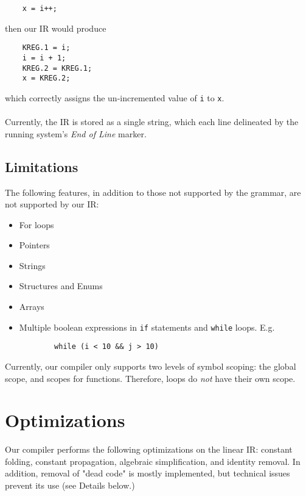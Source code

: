 \documentclass{scrartcl}
\begin{document}
\begin{verbatim}
    x = i++;
\end{verbatim}
then our IR would produce
\begin{verbatim}
    KREG.1 = i;
    i = i + 1;
    KREG.2 = KREG.1;
    x = KREG.2;
\end{verbatim}
which correctly assigns the un-incremented value of \verb|i| to \verb|x|.\\
\\
Currently, the IR is stored as a single string, which each line delineated by the running system's \textit{End of Line} marker.

\subsection{Limitations}
The following features, in addition to those not supported by the grammar, are not supported by our IR:
\begin{itemize}
    \item For loops
    \item Pointers
    \item Strings
    \item Structures and Enums
    \item Arrays
    \item Multiple boolean expressions in \verb|if| statements and \verb|while| loops. E.g.
    \begin{verbatim}
        while (i < 10 && j > 10)
    \end{verbatim}
\end{itemize}
Currently, our compiler only supports two levels of symbol scoping: the global scope, and scopes for functions. Therefore, loops do \textit{not} have their own scope.

\section{Optimizations}
Our compiler performs the following optimizations on the linear IR: constant folding, constant propagation, algebraic simplification, and identity removal. In addition, removal of "dead code" is mostly implemented, but technical issues prevent its use (see Details below.)
\end{document}

